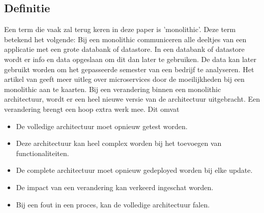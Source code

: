 \subsection{Definitie}
Een term die vaak zal terug keren in deze paper is 'monolithic'. Deze term betekend het volgende: Bij een monolithic communiceren alle deeltjes van een applicatie met een grote databank of datastore. In een databank of datastore wordt er info en data opgeslaan om dit dan later te gebruiken. De data kan later gebruikt worden om het gepasseerde semester van een bedrijf te analyseren. 
Het artikel van \textcite{Mauersberger2017} geeft meer uitleg over microservices door de moeilijkheden bij een monolithic aan te kaarten. Bij een verandering binnen een monolithic architectuur, wordt er een heel nieuwe versie van de architectuur uitgebracht. Een verandering brengt een hoop extra werk mee. Dit omvat 
\begin{itemize}
	\item De volledige architectuur moet opnieuw getest worden.
	\item Deze architectuur kan heel complex worden bij het toevoegen van functionaliteiten.
	\item De complete architectuur moet opnieuw gedeployed worden bij elke update.
	\item De impact van een verandering kan verkeerd ingeschat worden.
	\item Bij een fout in een proces, kan de volledige architectuur falen.
\end{itemize}
